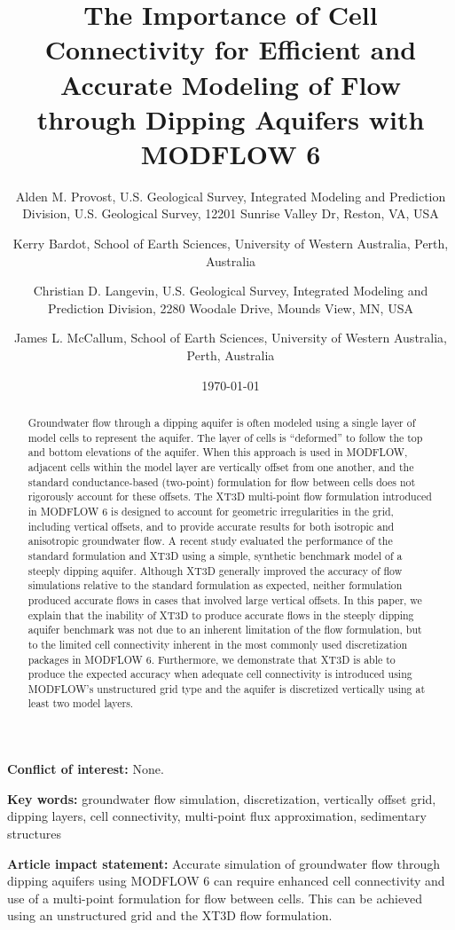 \documentclass{article}
\title{The Importance of Cell Connectivity for Efficient and Accurate Modeling of Flow through Dipping Aquifers with MODFLOW 6}
\author{
	Alden M. Provost, U.S. Geological Survey, Integrated Modeling and Prediction Division, U.S. Geological Survey, 12201 Sunrise Valley Dr, Reston, VA, USA  \\
	\and 
	Kerry Bardot, School of Earth Sciences, University of Western Australia, Perth, Australia \\
	\and 
	Christian D. Langevin, U.S. Geological Survey, Integrated Modeling and Prediction Division, 2280 Woodale Drive, Mounds View, MN, USA \\
	\and 
	James L. McCallum, School of Earth Sciences, University of Western Australia, Perth, Australia \\
	}
\date{\today}
\begin{document}
\maketitle

\textbf{Conflict of interest:} None.

\textbf{Key words:} groundwater flow simulation, discretization, vertically offset grid, dipping layers, cell connectivity, multi-point flux approximation, sedimentary structures

\textbf{Article impact statement:} Accurate simulation of groundwater flow through dipping aquifers using MODFLOW 6 can require enhanced cell connectivity and use of a multi-point formulation for flow between cells. This can be achieved using an unstructured grid and the XT3D flow formulation.

\begin{abstract}

Groundwater flow through a dipping aquifer is often modeled using a single layer of model cells to represent the aquifer. The layer of cells is ``deformed'' to follow the top and bottom elevations of the aquifer. When this approach is used in MODFLOW, adjacent cells within the model layer are vertically offset from one another, and the standard conductance-based (two-point) formulation for flow between cells does not rigorously account for these offsets. The XT3D multi-point flow formulation introduced in MODFLOW 6 is designed to account for geometric irregularities in the grid, including vertical offsets, and to provide accurate results for both isotropic and anisotropic groundwater flow.  A recent study evaluated the performance of the standard formulation and XT3D using a simple, synthetic benchmark model of a steeply dipping aquifer. Although XT3D generally improved the accuracy of flow simulations relative to the standard formulation as expected, neither formulation produced accurate flows in cases that involved large vertical offsets. In this paper, we explain that the inability of XT3D to produce accurate flows in the steeply dipping aquifer benchmark was not due to an inherent limitation of the flow formulation, but to the limited cell connectivity inherent in the most commonly used discretization packages in MODFLOW 6. Furthermore, we demonstrate that XT3D is able to produce the expected accuracy when adequate cell connectivity is introduced using MODFLOW's unstructured grid type and the aquifer is discretized vertically using at least two model layers.

\end{abstract}
\end{document}
